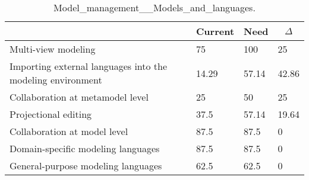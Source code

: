
  \begin{table*}[]
  \centering
  \notsotiny
  \caption{ Model_management__Models_and_languages.}
\label{tab:model_management__models_and_languages}
\begin{tabular}{|l|l|l|l|}
  \hline
  \rowcolor[HTML]{C0C0C0}
    \multicolumn{1}{|c|}{Feature} & \multicolumn{1}{c|}{Current} & \multicolumn{1}{c|}{Need} & \multicolumn{1}{c|}{$\Delta$} \\ \hline
  Multi-view modeling & 75 & 100 & 25 \\ \hline 
Importing external languages into the modeling environment & 14.29 & 57.14 & 42.86 \\ \hline 
Collaboration at metamodel level & 25 & 50 & 25 \\ \hline 
Projectional editing & 37.5 & 57.14 & 19.64 \\ \hline 
Collaboration at model level & 87.5 & 87.5 & 0 \\ \hline 
Domain-specific modeling languages & 87.5 & 87.5 & 0 \\ \hline 
General-purpose modeling languages & 62.5 & 62.5 & 0 \\ \hline 
\end{tabular}%
  \end{table*}